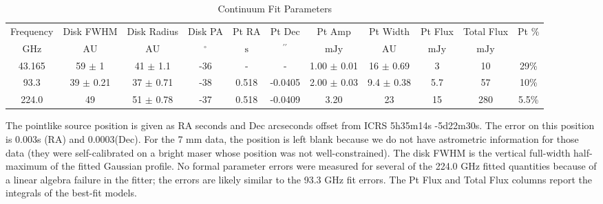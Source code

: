 \begin{table*}[htp]
\centering
\caption{Continuum Fit Parameters}
\begin{tabular}{ccccccccccc}
\label{tab:continuum_fit_parameters}
Frequency & Disk FWHM & Disk Radius & Disk PA & Pt RA & Pt Dec & Pt Amp & Pt Width & Pt Flux & Total Flux & Pt \% \\
$\mathrm{GHz}$ & $\mathrm{AU}$ & $\mathrm{AU}$ & $\mathrm{{}^{\circ}}$ & $\mathrm{s}$ & $\mathrm{{}^{\prime\prime}}$ & $\mathrm{mJy}$ & $\mathrm{AU}$ & $\mathrm{mJy}$ & $\mathrm{mJy}$ & $\mathrm{}$ \\
\hline
43.165 & 59 $\pm$ 1 & 41 $\pm$ 1.1 & -36 & - & - & 1.00 $\pm$ 0.01 & 16 $\pm$ 0.69 & 3 & 10 & 29\% \\
93.3 & 39 $\pm$ 0.21 & 37 $\pm$ 0.71 & -38 & 0.518 & -0.0405 & 2.00 $\pm$ 0.03 & 9.4 $\pm$ 0.38 & 5.7 & 57 & 10\% \\
224.0 & 49 & 51 $\pm$ 0.78 & -37 & 0.518 & -0.0409 & 3.20 & 23 & 15 & 280 & 5.5\% \\
\hline
\end{tabular}

\par The pointlike source position is given as RA seconds and Dec arcseconds offset from ICRS 5h35m14s -5d22m30s.  The error on this position is 0.003s (RA) and 0.0003\arcsec (Dec). For the 7 mm data, the position is left blank because we do not have astrometric information for those data (they were self-calibrated on a bright maser whose position was not well-constrained).  The disk FWHM is the vertical full-width half-maximum of the fitted Gaussian profile.  No formal parameter errors were measured for several of the 224.0 GHz fitted quantities because of a linear algebra failure in the fitter; the errors are likely similar to the 93.3 GHz fit errors. The Pt Flux and Total Flux columns report the integrals of the best-fit models.
\end{table*}
